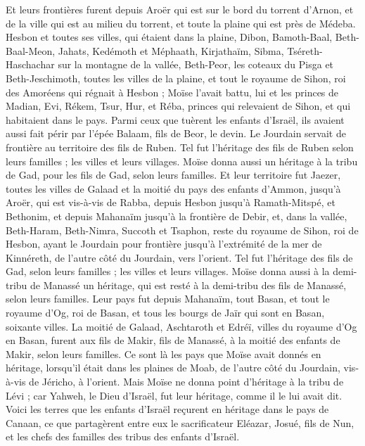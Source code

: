 \begin{multicols}{2}
Et leurs frontières furent depuis Aroër qui est sur le bord du torrent d’Arnon, et de la ville qui est au milieu du torrent, et toute la plaine qui est près de Médeba.
Hesbon et toutes ses villes, qui étaient dans la plaine, Dibon, Bamoth-Baal, Beth-Baal-Meon,
Jahats, Kedémoth et Méphaath,
Kirjathaïm, Sibma, Tséreth-Haschachar sur la montagne de la vallée,
Beth-Peor, les coteaux du Pisga et Beth-Jeschimoth,
toutes les villes de la plaine, et tout le royaume de Sihon, roi des Amoréens qui régnait à Hesbon ; Moïse l’avait battu, lui et les princes de Madian, Evi, Rékem, Tsur, Hur, et Réba, princes qui relevaient de Sihon, et qui habitaient dans le pays.
Parmi ceux que tuèrent les enfants d’Israël, ils avaient aussi fait périr par l’épée Balaam\FTNT{}, fils de Beor, le devin.
Le Jourdain servait de frontière au territoire des fils de Ruben. Tel fut l’héritage des fils de Ruben selon leurs familles ; les villes et leurs villages.
Moïse donna aussi un héritage à la tribu de Gad, pour les fils de Gad, selon leurs familles.
Et leur territoire fut Jaezer, toutes les villes de Galaad et la moitié du pays des enfants d’Ammon, jusqu’à Aroër, qui est vis-à-vis de Rabba,
depuis Hesbon jusqu’à Ramath-Mitspé, et Bethonim, et depuis Mahanaïm jusqu’à la frontière de Debir,
et, dans la vallée, Beth-Haram, Beth-Nimra, Succoth et Tsaphon, reste du royaume de Sihon, roi de Hesbon, ayant le Jourdain pour frontière jusqu’à l’extrémité de la mer de Kinnéreth, de l’autre côté du Jourdain, vers l’orient.
Tel fut l’héritage des fils de Gad, selon leurs familles ; les villes et leurs villages.
Moïse donna aussi à la demi-tribu de Manassé un héritage, qui est resté à la demi-tribu des fils de Manassé, selon leurs familles.
Leur pays fut depuis Mahanaïm, tout Basan, et tout le royaume d’Og, roi de Basan, et tous les bourgs de Jaïr qui sont en Basan, soixante villes.
La moitié de Galaad, Aschtaroth et Edréï, villes du royaume d’Og en Basan, furent aux fils de Makir, fils de Manassé, à la moitié des enfants de Makir, selon leurs familles.
Ce sont là les pays que Moïse avait donnés en héritage, lorsqu’il était dans les plaines de Moab, de l’autre côté du Jourdain, vis-à-vis de Jéricho, à l’orient.
Mais Moïse ne donna point d’héritage à la tribu de Lévi ; car Yahweh, le Dieu d’Israël, fut leur héritage, comme il le lui avait dit.
\VerseOne{}Voici les terres que les enfants d’Israël reçurent en héritage dans le pays de Canaan, ce que partagèrent entre eux le sacrificateur Eléazar, Josué, fils de Nun, et les chefs des familles des tribus des enfants d’Israël.

\end{multicols}
